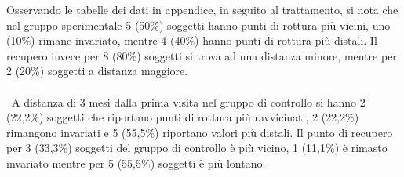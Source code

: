 Osservando le tabelle dei dati in appendice, in seguito al trattamento, si nota che nel gruppo sperimentale 5 (50\%) soggetti hanno punti di rottura più vicini, uno (10\%) rimane invariato, mentre 4 (40\%) hanno punti di rottura più distali. Il recupero invece per 8 (80\%) soggetti si trova ad una distanza minore, mentre per 2 (20\%) soggetti a distanza maggiore. 
\\\ \\\
A distanza di 3 mesi dalla prima visita nel gruppo di controllo si hanno 2 (22,2\%) soggetti che riportano punti di rottura più ravvicinati, 2 (22,2\%) rimangono invariati e 5 (55,5\%) riportano valori più distali. Il punto di recupero per 3 (33,3\%) soggetti del gruppo di controllo è più vicino, 1 (11,1\%) è rimasto invariato mentre per 5 (55,5\%) soggetti è più lontano. 

